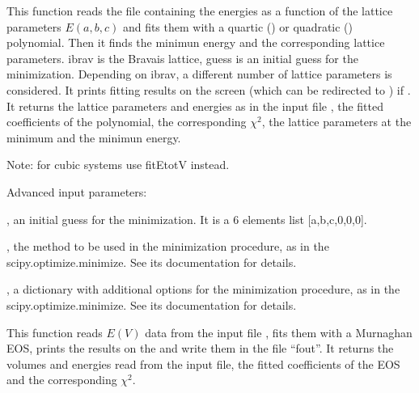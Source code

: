 \documentclass[letterpaper,10pt,english]{sphinxmanual}
\begin{document}
\begin{fulllineitems}
This function reads the file  containing the energies as a function
of the lattice parameters \(E(a,b,c)\) and fits them with a quartic () or 
quadratic () polynomial. Then it finds the minimun energy
and the corresponding lattice parameters. 
ibrav is the Bravais lattice, guess is an initial guess for the minimization.
Depending on ibrav, a different number of lattice parameters is considered.
It prints fitting results on the screen (which can be redirected to )
if .
It returns the lattice parameters and energies as in the input file ,
the fitted coefficients of the polynomial, the corresponding \(\chi^2\),
the lattice parameters at the minimum and the minimun energy.

Note: for cubic systems use fitEtotV instead.

Advanced input parameters:

, an initial guess for the minimization. It is a 6 elements list 
{[}a,b,c,0,0,0{]}.

, the method to be used in the minimization procedure, as in the
scipy.optimize.minimize. See its documentation for details.

, a dictionary with additional options for the minimization 
procedure, as in the scipy.optimize.minimize. See its documentation for details.

\end{fulllineitems}


\begin{fulllineitems}
This function reads \(E(V)\) data from the input file , fits them with a Murnaghan EOS,
prints the results on the  and write them in the file ``fout''.
It returns the volumes and energies read from the input file, the fitted coefficients 
of the EOS and the corresponding \(\chi^2\).

\end{fulllineitems}
\end{document}
